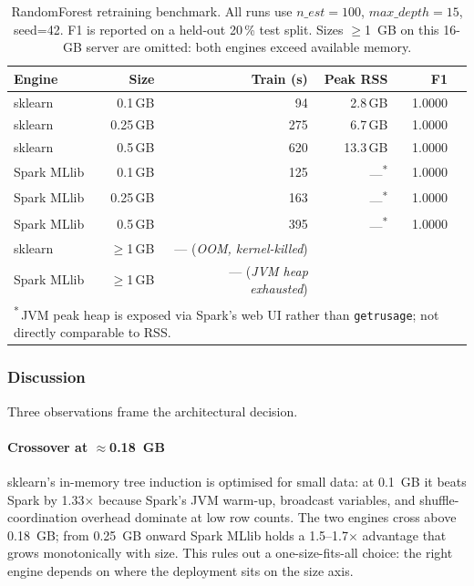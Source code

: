 \begin{table}[t]
\centering\small
\caption{RandomForest retraining benchmark. All runs use
$n\_est{=}100$, $max\_depth{=}15$, seed=42. F1 is reported on a
held-out 20\,\% test split. Sizes $\geq$1~GB on this 16-GB server are
omitted: both engines exceed available memory.}
\label{tbl:retraining}
\setlength{\tabcolsep}{4pt}
\begin{tabular}{lrrrrr}
\toprule
\textbf{Engine} & \textbf{Size} & \textbf{Train (s)} & \textbf{Peak RSS} & \textbf{F1} \\
\midrule
sklearn        & 0.1\,GB & 94      & 2.8\,GB  & 1.0000 \\
sklearn        & 0.25\,GB & 275    & 6.7\,GB  & 1.0000 \\
sklearn        & 0.5\,GB & 620     & 13.3\,GB & 1.0000 \\
Spark MLlib    & 0.1\,GB & 125     & ---\textsuperscript{*}  & 1.0000 \\
Spark MLlib    & 0.25\,GB & 163    & ---\textsuperscript{*}  & 1.0000 \\
Spark MLlib    & 0.5\,GB & 395     & ---\textsuperscript{*}  & 1.0000 \\
\midrule
sklearn        & $\geq$1\,GB & --- (\textit{OOM, kernel-killed}) \\
Spark MLlib    & $\geq$1\,GB & --- (\textit{JVM heap exhausted})  \\
\bottomrule
\multicolumn{5}{l}{\footnotesize
  \textsuperscript{*}\,JVM peak heap is exposed via Spark's web UI
  rather than \texttt{getrusage}; not directly comparable to RSS.}
\end{tabular}
\end{table}

\subsubsection{Discussion}
\label{sec:retraining-discussion}

Three observations frame the architectural decision.

\paragraph{Crossover at $\approx$0.18~GB} sklearn's in-memory tree
induction is optimised for small data: at 0.1~GB it beats Spark
by 1.33$\times$ because Spark's JVM warm-up, broadcast variables,
and shuffle-coordination overhead dominate at low row counts. The
two engines cross above 0.18~GB; from 0.25~GB onward Spark MLlib
holds a 1.5--1.7$\times$ advantage that grows monotonically with
size. This rules out a one-size-fits-all choice: the right engine
depends on where the deployment sits on the size axis.

